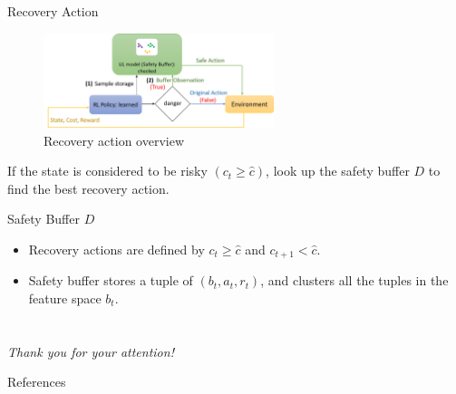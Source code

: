 \documentclass[8pt, aspectratio=169]{beamer} %
\begin{document}
\begin{frame}{\insertsubsectionhead}{Recovery Action \cite{hsu2022improving}}

  \begin{figure}
    \includegraphics[width=0.6\textwidth]{figures/recovery-action.png}
    \caption{Recovery action overview}
  \end{figure}

  If the state is considered to be risky $(c_t \geq \hat{c})$, look up the safety buffer $D$ to find the best recovery action.
  
  \vspace{0.5cm}

  Safety Buffer $D$

  \begin{itemize}
    \item Recovery actions are defined by $c_t \geq \hat{c}$ and $c_{t + 1} < \hat{c}$.
    \item Safety buffer stores a tuple of $(b_t, a_t, r_t)$, and clusters all the tuples in the feature space $b_t$.
  \end{itemize}

\end{frame}



\section{}
\begin{frame}{}
    \centering \Large
    \emph{Thank you for your attention!}
\end{frame}



\begin{frame}[allowframebreaks]{References}

  
  

\end{frame}
\end{document}
